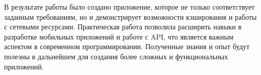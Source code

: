 В результате работы было создано приложение,
которое не только соответствует заданным требованиям,
но и демонстрирует возможности кэширования и работы с сетевыми ресурсами.
Практическая работа позволила расширить навыки
в разработке мобильных приложений и работе с API,
что является важным аспектом в современном программировании.
Полученные знания и опыт будут полезны в дальнейшем
для создания более сложных и функциональных приложений.

